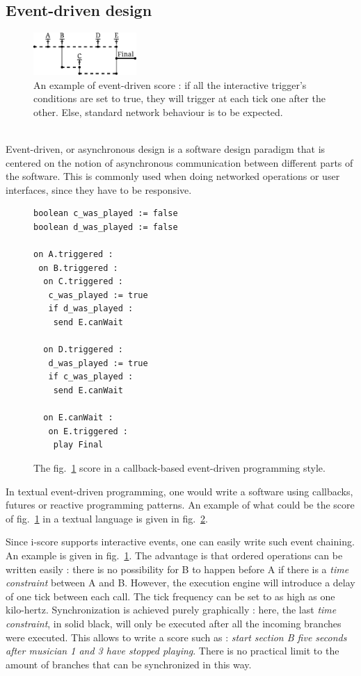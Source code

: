 \documentclass{article}
\newcommand{\timeconstraint}{\textit{time constraint}\xspace}
\begin{document}
\subsection{Event-driven design}
\begin{figure}[h]
    \centering
    \includegraphics[width=0.35\textwidth]{images/event.eps}
    \caption{An example of event-driven score : if all the interactive trigger's conditions are set to true, they will trigger at each tick one after the other. Else, standard network behaviour is to be expected.}
    \label{fig.event}
\end{figure}~\\
Event-driven, or asynchronous design is a software design 
paradigm that is centered on the notion of asynchronous 
communication between different parts of the software.
This is commonly used when doing networked operations or 
user interfaces, since they have to be responsive.

\begin{figure}[h]
\begin{lstlisting}[language=Algol,basicstyle={\footnotesize\tt}]
boolean c_was_played := false
boolean d_was_played := false
  
on A.triggered :
 on B.triggered :
  on C.triggered :
   c_was_played := true
   if d_was_played :
    send E.canWait

  on D.triggered :
   d_was_played := true
   if c_was_played :
    send E.canWait
  
  on E.canWait :
   on E.triggered :
    play Final
\end{lstlisting}
\caption{The fig.~\ref{fig.event} score in a callback-based event-driven programming style.}
\label{fig.eventdriven}
\end{figure}

In textual event-driven programming, one would write a software 
using callbacks, futures or reactive programming patterns\cite{kambona2013evaluation}. 
An example of what could be the score of fig.~\ref{fig.event} in a textual language is given in fig.~\ref{fig.eventdriven}.

Since i-score supports interactive events, one can easily write such event chaining.
An example is given in fig.~\ref{fig.event}. 
The advantage is that ordered operations can be written easily : there is no 
possibility for B to happen before A if there is a \timeconstraint between A and B.
However, the execution engine will introduce a delay of one tick between each call.
The tick frequency can be set to as high as one kilo-hertz.
Synchronization is achieved purely graphically : here, the last \timeconstraint, in solid black, will 
only be executed after all the incoming branches were executed. 
This allows to write a score such as : \emph{start section B five seconds after musician 1 and 3 
have stopped playing}.
There is no practical limit to the amount of branches that can be synchronized in this way.
\end{document}
